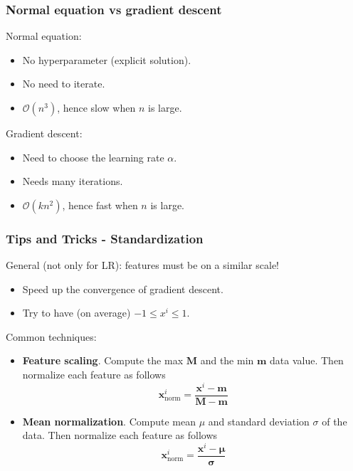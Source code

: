 \documentclass{beamer}
\begin{document}
	\begin{frame}
		\frametitle{Normal equation vs gradient descent}
		Normal equation:
		\begin{itemize}
			\item No hyperparameter (explicit solution).
			\item No need to iterate.
			\item $\mathcal{O}(n^3)$, hence slow when $n$ is large.
		\end{itemize}
	
		\vspace{5mm}
	
		Gradient descent:
		\begin{itemize}
			\item Need to choose the learning rate $\alpha$.
			\item Needs many iterations.
			\item $\mathcal{O}(kn^2)$, hence fast when $n$ is large.
		\end{itemize}
	\end{frame}

	\begin{frame}
		\frametitle{Tips and Tricks - Standardization}
		General (not only for LR): features must be on a similar scale!
		\begin{itemize}
			\item Speed up the convergence of gradient descent.
			\item Try to have (on average) $-1 \leq x^i \leq 1$.
		\end{itemize}
		Common techniques:
		\begin{itemize}
			\item \textbf{Feature scaling}. Compute the max $\bm{M}$ and the min $\bm{m}$ data value. Then normalize each feature as follows
			\begin{equation*}
				\bm{x}_{\text{norm}}^i = \frac{\bm{x}^i - \bm{m}}{\bm{M} - \bm{m}}
			\end{equation*} 
			\item \textbf{Mean normalization}. Compute mean $\mu$ and standard deviation $\sigma$ of the data. Then normalize each feature as follows
			\begin{equation*}
				\bm{x}_{\text{norm}}^i = \frac{\bm{x}^i -\bm{\mu}}{\bm{\sigma}} 
			\end{equation*}
		\end{itemize}
	\end{frame}
\end{document}
